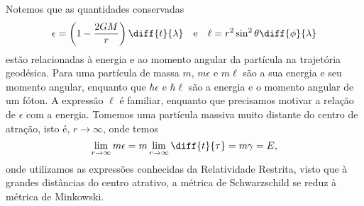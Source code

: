 Notemos que as quantidades conservadas
\begin{equation*}
    \epsilon = \left(1 - \frac{2GM}{r}\right)\diff{t}{\lambda}\quad\text{e}\quad \ell = r^2\sin^2\theta \diff{\phi}{\lambda}
\end{equation*}
estão relacionadas à energia e ao momento angular da partícula na trajetória geodésica. Para uma partícula de massa \(m\), \(m \epsilon\) e \( m \ell\) são a sua energia e seu momento angular, enquanto que \(\hbar \epsilon\) e \(\hbar \ell\) são a energia e o momento angular de um fóton. A expressão \(\ell\) é familiar, enquanto que precisamos motivar a relação de \(\epsilon\) com a energia. Tomemos uma partícula massiva muito distante do centro de atração, isto é, \(r \to \infty\), onde temos
\begin{equation*}
    \lim_{r\to\infty} m\epsilon = m \lim_{r\to \infty} \diff{t}{\tau} = m \gamma = E,
\end{equation*}
onde utilizamos as expressões conhecidas da Relatividade Restrita, visto que à grandes distâncias do centro atrativo, a métrica de Schwarzschild se reduz à métrica de Minkowski.

